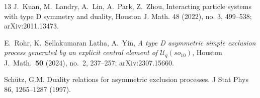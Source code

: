 \documentclass{article}
\begin{document}
\begin{thebibliography}{13}
J.~Kuan, M.~Landry, A.~Lin, A.~Park, Z.~Zhou,
Interacting particle systems with type D symmetry and duality, Houston J. Math. 48 (2022), no. 3, 499–538; arXiv:2011.13473.


E.~Rohr, K.~Sellakumaran Latha, A.~Yin, \emph{A type D asymmetric simple
  exclusion process generated by an explicit central element of
  $\mathcal U_q(so_{10})$}, Houston J.~Math.~\textbf{50} (2024), no.~2, 237--257;
  arXiv:2307.15660.
  

Sch\"{u}tz, G.M. Duality relations for asymmetric exclusion processes. J Stat Phys 86, 1265–1287 (1997). 

 
\end{thebibliography}
\end{document}
